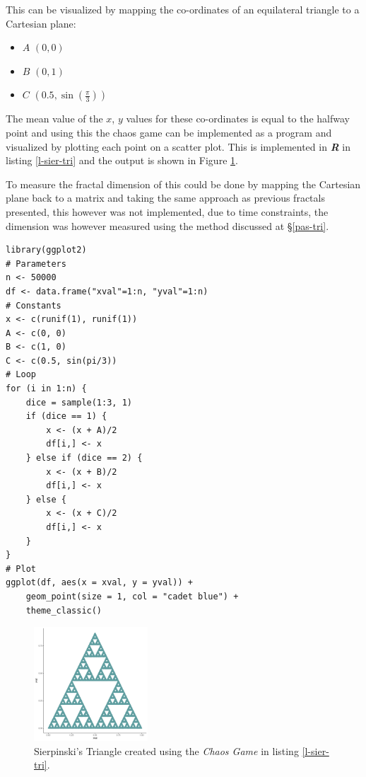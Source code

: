 \documentclass[a4paper,11pt,twoside]{article}
\begin{document}
This can be visualized by mapping the co-ordinates of an equilateral triangle to a Cartesian plane:

\begin{itemize}
\item \(A\)  \(\left(0, 0\right)\)
\item \(B\)  \(\left(0, 1\right)\)
\item \(C\)  \(\left(0.5, \sin\left(\frac{\pi}{3}\right)\right)\)
\end{itemize}

The mean value of the \(x\), \(y\) values for these co-ordinates is equal to the
halfway point and using this the chaos game can be implemented as a program and
visualized by plotting each point on a scatter plot. This is implemented in
\emph{\textbf{R}} in listing \ref{l-sier-tri} and the output is shown in Figure \ref{fig:s-tri}.

To measure the fractal dimension of this could be done by mapping the Cartesian
plane back to a matrix and taking the same approach as previous fractals
presented, this however was not implemented, due to time constraints, the
dimension was however measured using the method discussed at \S \ref{pas-tri}.

\newpage
\begin{listing}[htbp]
\begin{verbatim}
library(ggplot2)
# Parameters
n <- 50000
df <- data.frame("xval"=1:n, "yval"=1:n)
# Constants
x <- c(runif(1), runif(1))
A <- c(0, 0)
B <- c(1, 0)
C <- c(0.5, sin(pi/3))
# Loop
for (i in 1:n) {
    dice = sample(1:3, 1)
    if (dice == 1) {
        x <- (x + A)/2
        df[i,] <- x
    } else if (dice == 2) {
        x <- (x + B)/2
        df[i,] <- x
    } else {
        x <- (x + C)/2
        df[i,] <- x
    }
}
# Plot
ggplot(df, aes(x = xval, y = yval)) +
    geom_point(size = 1, col = "cadet blue") +
    theme_classic()

\end{verbatim}
\caption{\label{l-sier-tri}R code to construct Sierpinksi's triangle through the Chaos Game, shown in Figure \ref{fig:s-tri}.}
\end{listing}

\newpage
\begin{figure}
\centering
\includegraphics[width=0.38\textwidth]{pascal-sierpinsky-chaos-game.png}
\caption{\label{fig:s-tri}Sierpinski's Triangle created using the \emph{Chaos Game} in listing \ref{l-sier-tri}.}
\end{figure}
\end{document}
